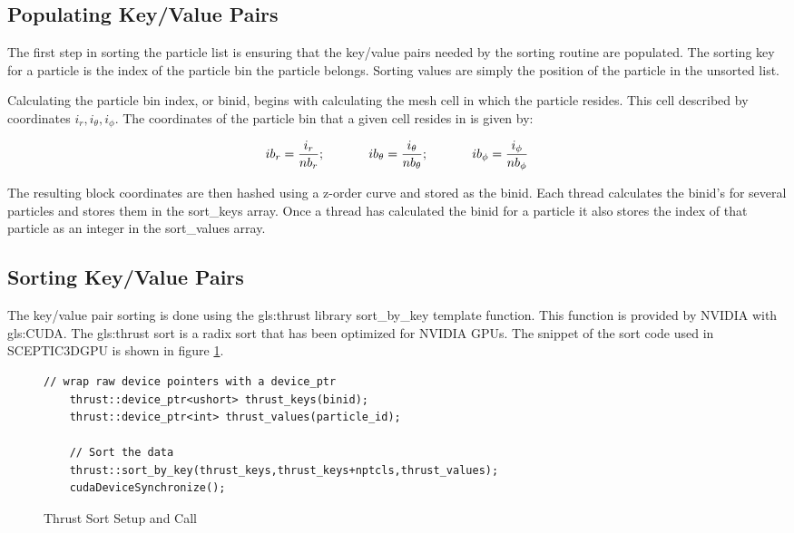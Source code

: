 		\subsection{Populating Key/Value Pairs}
The first step in sorting the particle list is ensuring that the key/value pairs needed by the sorting routine are populated. The sorting key for a particle is the index of the particle bin the particle belongs. Sorting values are simply the position of the particle in the unsorted list. 

Calculating the particle bin index, or binid, begins with calculating the mesh cell in which the particle resides. This cell described by coordinates $i_r, i_{\theta}, i_{\phi}$. The coordinates of the particle bin that a given cell resides in is given by:

\begin{equation}
ib_r = \frac{i_r}{nb_r} \mathrm{;}\hspace{0.5in} ib_{\theta} = \frac{i_{\theta}}{nb_{\theta}} \mathrm{;} \hspace{0.5in} ib_{\phi} = \frac{i_{\phi}}{nb_{\phi}}
\end{equation}

	The resulting block coordinates are then hashed using a z-order curve and stored as the binid. Each thread calculates the binid's for several particles and stores them in the sort\_keys array. Once a thread has calculated the binid for a particle it also stores the index of that particle as an integer in the sort\_values array. 

		\subsection{Sorting Key/Value Pairs}
		The key/value pair sorting is done using the \gls{gls:thrust} library sort\_by\_key template function. This function is provided by NVIDIA with \gls{gls:CUDA}. The \gls{gls:thrust} sort is a radix sort that has been optimized for NVIDIA GPUs\cite{NVIDIACorporation2011a}. The snippet of the sort code used in SCEPTIC3DGPU is shown in figure \ref{fig:thrust_sort}.

\begin{figure}
\begin{lstlisting}[frame=single]
	// wrap raw device pointers with a device_ptr
	thrust::device_ptr<ushort> thrust_keys(binid);
	thrust::device_ptr<int> thrust_values(particle_id);

	// Sort the data
	thrust::sort_by_key(thrust_keys,thrust_keys+nptcls,thrust_values);
	cudaDeviceSynchronize();
\end{lstlisting}
\vspace{-0.4in}
\caption{Thrust Sort Setup and Call}
\label{fig:thrust_sort}
\end{figure}


